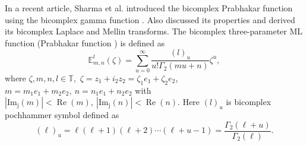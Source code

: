 \documentclass[a4paper,12pt]{article}
\theoremstyle{remark}
\begin{document}
In a recent article, Sharma et al. \cite{ragarwal2025} introduced the bicomplex Prabhakar function  using the bicomplex gamma function \cite{goyal2006}. Also discussed its properties and derived its  bicomplex Laplace and Mellin transforms. The bicomplex three-parameter  ML function (Prabhakar function ) is defined as 
\begin{equation}\label{eq: bc ml 3 para}
\mathbb{E}_{m,n}^l(\zeta)=\sum_{u=0}^{\infty}\frac{(l)_u}{u!\Gamma_2(m u+n )}\zeta^u,  \end{equation}
where $\zeta, m,n,l\in \mathbb{T},$ 
$\zeta= z_1+i_2z_2= \zeta_1e_1+\zeta_2e_2$, $m= m_1e_1+m_2e_2,  ~ n=n_1e_1+n_2e_2$ with $|\operatorname{Im_j}(m)|<\operatorname{Re}(m),~|\operatorname{Im_j}(n)|<\operatorname{Re}(n).$	Here $(l)_u$ is bicomplex pochhammer symbol defined  as \cite{goyal2006}
\[
(\ell)_u = \ell(\ell+1)(\ell+2)\cdots(\ell+u-1) = \frac{\Gamma_2(\ell+u)}{\Gamma_2(\ell)}.
\]
\end{document}
